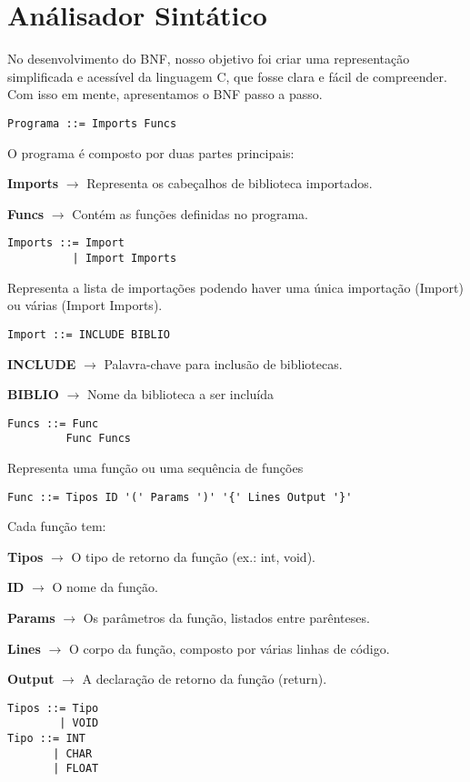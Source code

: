 \documentclass[12pt,a4paper]{report}
\begin{document}
\chapter{An\'{a}lisador Sint\'{a}tico}
No desenvolvimento do BNF, nosso objetivo foi criar uma representação simplificada e acessível da linguagem C, que fosse clara e fácil de compreender. Com isso em mente, apresentamos o BNF passo a passo.
\begin{lstlisting}
Programa ::= Imports Funcs
\end{lstlisting}
O programa é composto por duas partes principais:

\textbf{Imports} $\rightarrow$ Representa os cabeçalhos de biblioteca importados.

\textbf{Funcs} $\rightarrow$ Contém as funções definidas no programa.
\begin{lstlisting}
Imports ::= Import
          | Import Imports 
\end{lstlisting}
Representa a lista de importações podendo haver uma única importação (Import) ou várias (Import Imports).
\begin{lstlisting}
Import ::= INCLUDE BIBLIO  
\end{lstlisting}

\textbf{INCLUDE} $\rightarrow$ Palavra-chave para inclusão de bibliotecas.

\textbf{BIBLIO} $\rightarrow$ Nome da biblioteca a ser incluída
\begin{lstlisting}
Funcs ::= Func
         Func Funcs
\end{lstlisting}
Representa uma função ou uma sequência de funções
\begin{lstlisting}
Func ::= Tipos ID '(' Params ')' '{' Lines Output '}'
\end{lstlisting}
Cada função tem:

\textbf{Tipos} $\rightarrow$ O tipo de retorno da função (ex.: int, void).

\textbf{ID} $\rightarrow$ O nome da função.

\textbf{Params} $\rightarrow$ Os parâmetros da função, listados entre parênteses.

\textbf{Lines} $\rightarrow$ O corpo da função, composto por várias linhas de código.

\textbf{Output} $\rightarrow$ A declaração de retorno da função (return).
\begin{lstlisting}
Tipos ::= Tipo
        | VOID
Tipo ::= INT
       | CHAR
       | FLOAT
\end{lstlisting}
\end{document}
